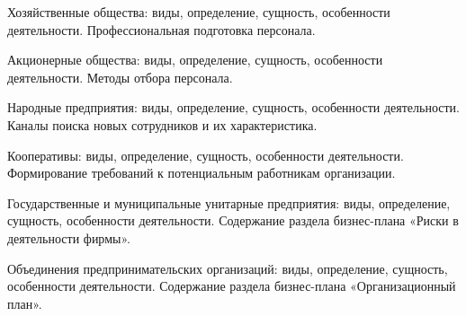 \documentclass[
	14pt,
	a4paper,
	]
	{scrartcl}
\begin{document}
\vfill

\newpage


\shapk
{}
\setcounter{zad}{0}

\vfill
\z Хозяйственные общества: виды, определение, сущность, особенности деятельности.
 \vfill
\z Профессиональная подготовка персонала.
 \vfill

\vfill

\newpage


\shapk
{}
\setcounter{zad}{0}

\vfill
\z Акционерные общества: виды, определение, сущность, особенности деятельности.
 \vfill
\z Методы отбора персонала.
 \vfill

\vfill

\newpage


\shapk
{}
\setcounter{zad}{0}

\vfill
\z Народные предприятия: виды, определение, сущность, особенности деятельности.
 \vfill
\z Каналы поиска новых сотрудников и их характеристика.
 \vfill

\vfill

\newpage


\shapk
{}
\setcounter{zad}{0}

\vfill
\z Кооперативы: виды, определение, сущность, особенности деятельности.
 \vfill
\z Формирование требований к потенциальным работникам организации.
 \vfill

\vfill

\newpage


\shapk
{}
\setcounter{zad}{0}

\vfill
\z Государственные и муниципальные унитарные предприятия: виды, определение, сущность, особенности деятельности.
 \vfill
\z Содержание раздела бизнес-плана «Риски в деятельности фирмы».
 \vfill

\vfill

\newpage


\shapk
{}
\setcounter{zad}{0}

\vfill
\z Объединения предпринимательских организаций: виды, определение, сущность, особенности деятельности.
 \vfill
\z Содержание раздела бизнес-плана «Организационный план».
 \vfill

\vfill

\newpage


\shapk
{}
\setcounter{zad}{0}
\end{document}
